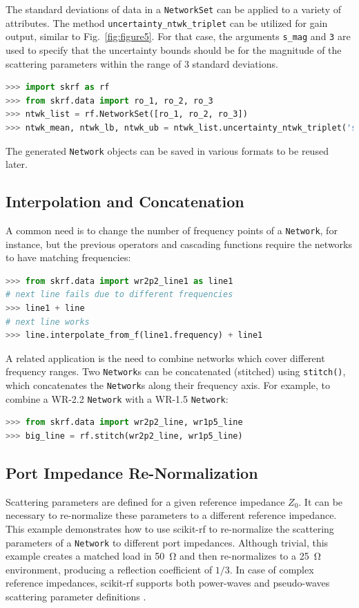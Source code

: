 \documentclass{IEEEjmw}
\begin{document}
The standard deviations of data in a \texttt{NetworkSet} can be applied to a variety of attributes. The method \texttt{uncertainty\_ntwk\_triplet} can be utilized for gain output, similar to Fig.~\ref{fig:figure5}. For that case, the arguments \texttt{s\_mag} and \texttt{3} are used to specify that the uncertainty bounds should be for the magnitude of the scattering parameters within the range of 3 standard deviations.

\begin{lstlisting}[language=Python]
>>> import skrf as rf
>>> from skrf.data import ro_1, ro_2, ro_3
>>> ntwk_list = rf.NetworkSet([ro_1, ro_2, ro_3])
>>> ntwk_mean, ntwk_lb, ntwk_ub = ntwk_list.uncertainty_ntwk_triplet('s_mag', 3)
\end{lstlisting}

The generated \texttt{Network} objects can be saved in various formats to be reused later.

\subsection{Interpolation and Concatenation}
A common need is to change the number of frequency points of a \texttt{Network}, for instance, but the previous operators and cascading functions require the networks to have matching frequencies:

\begin{lstlisting}[language=Python]
>>> from skrf.data import wr2p2_line1 as line1
# next line fails due to different frequencies
>>> line1 + line 
# next line works
>>> line.interpolate_from_f(line1.frequency) + line1  
\end{lstlisting}

A related application is the need to combine networks which cover different frequency ranges. Two \texttt{Network}s can be concatenated (stitched) using \texttt{stitch()}, which concatenates the \texttt{Network}s along their frequency axis. For example, to combine a WR-2.2 \texttt{Network} with a WR-1.5 \texttt{Network}:

\begin{lstlisting}[language=Python]
>>> from skrf.data import wr2p2_line, wr1p5_line
>>> big_line = rf.stitch(wr2p2_line, wr1p5_line)
\end{lstlisting}

\subsection{Port Impedance Re-Normalization}
Scattering parameters are defined for a given reference impedance $Z_0$. It can be necessary to re-normalize these parameters to a different reference impedance. This example demonstrates how to use scikit-rf to re-normalize the  scattering parameters of a \texttt{Network} to different port impedances. Although trivial, this example creates a matched load in \SI{50}{\ohm} and then re-normalizes to a \SI{25}{\ohm} environment, producing a reflection coefficient of $1/3$. In case of complex reference impedances, scikit-rf supports both power-waves and pseudo-waves scattering parameter definitions \cite{williams2013}.
\end{document}
